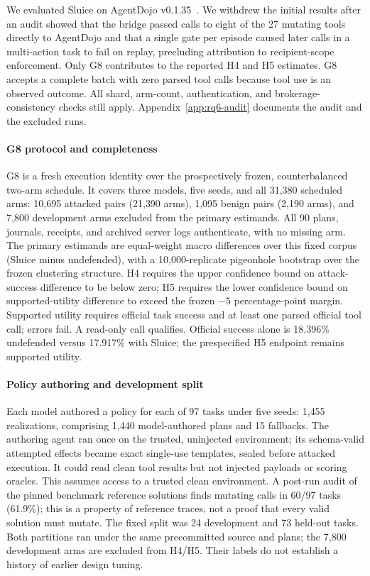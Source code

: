\documentclass[conference,compsoc]{IEEEtran}
\newcommand{\sys}{Sluice}
\begin{document}
{We evaluated Sluice on AgentDojo v0.1.35~\cite{agentdojo2024}. We withdrew the initial results after an audit showed that the bridge passed calls to eight of the 27 mutating tools directly to AgentDojo and that a single gate per episode caused later calls in a multi-action task to fail on replay, precluding attribution to recipient-scope enforcement. Only G8 contributes to the reported H4 and H5 estimates. G8 accepts a complete batch with zero parsed tool calls because tool use is an observed outcome. All shard, arm-count, authentication, and brokerage-consistency checks still apply. Appendix~\ref{app:rq6-audit} documents the audit and the excluded runs.}

\paragraph{G8 protocol and completeness}
G8 is a fresh execution identity over the prospectively frozen,
counterbalanced two-arm schedule. It covers three models, five seeds, and all
31{,}380 scheduled arms: 10{,}695 attacked pairs (21{,}390 arms), 1{,}095
benign pairs (2{,}190 arms), and 7{,}800 development arms excluded from the
primary estimands. All 90 plans, journals, receipts, and archived server logs
authenticate, with no missing arm. The primary estimands are equal-weight
macro differences over this fixed corpus (\sys{} minus undefended), with a
10{,}000-replicate pigeonhole bootstrap over the frozen clustering structure.
H4 requires the upper confidence bound on attack-success difference to be
below zero; H5 requires the lower confidence bound on supported-utility
difference to exceed the frozen $-5$ percentage-point margin.
Supported utility requires official task success and at least one parsed official tool call; errors fail. A read-only call qualifies. Official success alone is 18.396\% undefended versus 17.917\% with Sluice; the prespecified H5 endpoint remains supported utility.

\paragraph{Policy authoring and development split}
Each model authored a policy for each of 97 tasks under five seeds: 1{,}455 realizations, comprising 1{,}440 model-authored plans and 15 fallbacks. The authoring agent ran once on the trusted, uninjected environment; its schema-valid attempted effects became exact single-use templates, sealed before attacked execution. It could read clean tool results but not injected payloads or scoring oracles. This assumes access to a trusted clean environment. A post-run audit of the pinned benchmark reference solutions finds mutating calls in 60/97 tasks (61.9\%); this is a property of reference traces, not a proof that every valid solution must mutate. The fixed split was 24 development and 73 held-out tasks. Both partitions ran under the same precommitted source and plans; the 7{,}800 development arms are excluded from H4/H5. Their labels do not establish a history of earlier design tuning.
\end{document}
